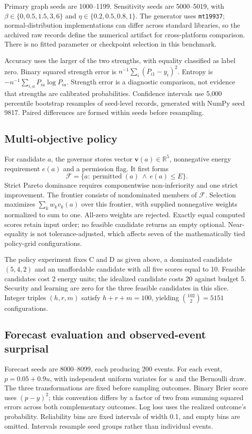 \documentclass[10pt,a4paper]{article}
\newcommand{\R}{\mathbb{R}}
\begin{document}
Primary graph seeds are 1000--1199. Sensitivity seeds are 5000--5019, with $\beta\in\{0,0.5,1.5,3,6\}$ and $\eta\in\{0.2,0.5,0.8,1\}$. The generator uses \texttt{mt19937}; normal-distribution implementations can differ across standard libraries, so the archived raw records define the numerical artifact for cross-platform comparison. There is no fitted parameter or checkpoint selection in this benchmark.

Accuracy uses the larger of the two strengths, with equality classified as label zero. Binary squared strength error is $n^{-1}\sum_i(P_{i1}-y_i)^2$. Entropy is $-n^{-1}\sum_{i,a}P_{ia}\log P_{ia}$. Strength error is a diagnostic comparison, not evidence that strengths are calibrated probabilities. Confidence intervals use 5,000 percentile bootstrap resamples of seed-level records, generated with NumPy seed 9817. Paired differences are formed within seeds before resampling.

\subsection*{Multi-objective policy}
For candidate $a$, the governor stores vector $\mathbf{v}(a)\in\R^5$, nonnegative energy requirement $e(a)$ and a permission flag. It first forms
\begin{equation}
\mathcal{F}=\{a:\operatorname{permitted}(a)\ \land\ e(a)\leq E\}.
\end{equation}
Strict Pareto dominance requires componentwise non-inferiority and one strict improvement. The frontier consists of nondominated members of $\mathcal{F}$. Selection maximizes $\sum_k w_kv_k(a)$ over this frontier, with supplied nonnegative weights normalized to sum to one. All-zero weights are rejected. Exactly equal computed scores retain input order; no feasible candidate returns an empty optional. Near-equality is not tolerance-adjusted, which affects seven of the mathematically tied policy-grid configurations.

The policy experiment fixes C and D as given above, a dominated candidate $(5,4,2)$ and an unaffordable candidate with all five scores equal to 10. Feasible candidates cost 2 energy units; the idealized candidate costs 20 against budget 5. Security and learning are zero for the three feasible candidates in this slice. Integer triples $(h,r,m)$ satisfy $h+r+m=100$, yielding $\binom{102}{2}=5151$ configurations.

\subsection*{Forecast evaluation and observed-event surprisal}
Forecast seeds are 8000--8099, each producing 200 events. For each event, $p=0.05+0.9u$, with independent uniform variates for $u$ and the Bernoulli draw. The three transformations are fixed before sampling outcomes. Binary Brier score uses $(p-y)^2$; this convention differs by a factor of two from summing squared errors across both complementary outcomes. Log loss uses the realized outcome's probability. Reliability bins are fixed intervals of width 0.1, and empty bins are omitted. Intervals resample seed groups rather than individual events.
\end{document}
